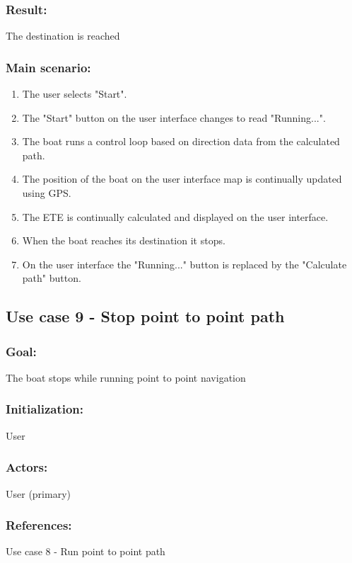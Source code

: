 \subsubsection*{Result:}
The destination is reached

\subsubsection*{Main scenario:}
\begin{enumerate}
	\item The user selects "Start".
	\item The "Start" button on the user interface changes to read "Running...".
	\item The boat runs a control loop based on direction data from the calculated path.
	\item The position of the boat on the user interface map is continually updated using GPS.
	\item The ETE is continually calculated and displayed on the user interface.
	\item When the boat reaches its destination it stops.
	\item On the user interface the "Running..." button is replaced by the "Calculate path" button.
\end{enumerate}	


\subsection{Use case 9 - Stop point to point path}
\subsubsection*{Goal:}
The boat stops while running point to point navigation

\subsubsection*{Initialization:}
User

\subsubsection*{Actors:}
User (primary)

\subsubsection*{References:}
Use case 8 - Run point to point path

